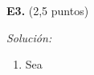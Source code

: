 \textbf{E3.} (2,5 puntos)


\vspace{20px}
\textit{Solución:}
\\

\begin{enumerate}
[label=\alph*)]
    \item Sea


\end{enumerate}